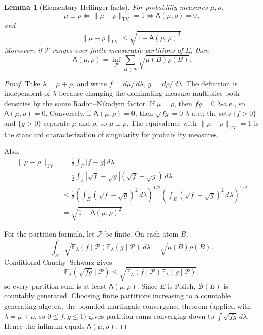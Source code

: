 \documentclass[12pt]{article}
\newcommand{\E}{\mathbb E}
\newcommand{\1}{\mathbf 1}
\newcommand{\dd}{\,d}
\newcommand{\TV}{\mathrm{TV}}
\newcommand{\Aff}{\mathsf A}
\newcommand{\cB}{\mathcal B}
\theoremstyle{plain}
\newtheorem{lemma}[theorem]{Lemma}
\theoremstyle{definition}
\theoremstyle{remark}
\numberwithin{equation}{section}
\begin{document}
\begin{lemma}[Elementary Hellinger facts]\label{lem:hellfacts}
For probability measures \(\mu,\rho\),
\[
\mu\perp\rho
\iff
\|\mu-\rho\|_{\TV}=1
\iff
\Aff(\mu,\rho)=0,
\]
and
\[
\|\mu-\rho\|_{\TV}
\le
\sqrt{1-\Aff(\mu,\rho)^2}.
\]
Moreover, if \(\mathcal P\) ranges over finite measurable partitions of \(E\),
then
\[
\Aff(\mu,\rho)
=
\inf_{\mathcal P}\sum_{B\in\mathcal P}\sqrt{\mu(B)\rho(B)}.
\]
\end{lemma}

\begin{proof}
Take \(\lambda=\mu+\rho\), and write \(f=\dd\mu/\dd\lambda\),
\(g=\dd\rho/\dd\lambda\).  The definition is independent of \(\lambda\) because
changing the dominating measure multiplies both densities by the same
Radon--Nikodym factor.  If \(\mu\perp\rho\), then \(fg=0\) \(\lambda\)-a.e., so
\(\Aff(\mu,\rho)=0\).  Conversely, if \(\Aff(\mu,\rho)=0\), then
\(\sqrt{fg}=0\) \(\lambda\)-a.e.; the sets \(\{f>0\}\) and \(\{g>0\}\) separate
\(\mu\) and \(\rho\), so \(\mu\perp\rho\).  The equivalence with
\(\|\mu-\rho\|_{\TV}=1\) is the standard characterization of singularity for
probability measures.

Also,
\[
\begin{aligned}
\|\mu-\rho\|_{\TV}
&=\frac12\int_E|f-g|\dd\lambda                                      \\
&=\frac12\int_E|\sqrt f-\sqrt g|(\sqrt f+\sqrt g)\dd\lambda          \\
&\le \frac12
\left(\int_E(\sqrt f-\sqrt g)^2\dd\lambda\right)^{1/2}
\left(\int_E(\sqrt f+\sqrt g)^2\dd\lambda\right)^{1/2}               \\
&=\sqrt{1-\Aff(\mu,\rho)^2}.
\end{aligned}
\]

For the partition formula, let \(\mathcal P\) be finite.  On each atom \(B\),
\[
\int_B\sqrt{\E_\lambda(f\mid\mathcal P)\E_\lambda(g\mid\mathcal P)}\dd\lambda
=
\sqrt{\mu(B)\rho(B)}.
\]
Conditional Cauchy--Schwarz gives
\[
\E_\lambda(\sqrt{fg}\mid\mathcal P)
\le
\sqrt{\E_\lambda(f\mid\mathcal P)\E_\lambda(g\mid\mathcal P)},
\]
so every partition sum is at least \(\Aff(\mu,\rho)\).  Since \(E\) is Polish,
\(\cB(E)\) is countably generated.  Choosing finite partitions increasing to a
countable generating algebra, the bounded martingale convergence theorem
(applied with \(\lambda=\mu+\rho\), so \(0\le f,g\le1\)) gives partition sums
converging down to \(\int\sqrt{fg}\dd\lambda\).  Hence the infimum equals
\(\Aff(\mu,\rho)\).
\end{proof}
\end{document}
